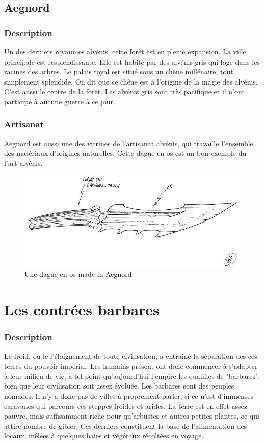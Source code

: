 \subsection{Aegnord}
\subsubsection{Description}
\hypertarget{aegnord}{}Un des derniers royaumes alvénis, cette forêt est en pleine expansion.
La ville principale est resplendissante.
Elle est habité par des alvénis gris qui loge dans les racines des arbres.
Le palais royal est situé sous un chêne millénaire, tout simplement splendide.
On dit que ce chêne est à l'origine de la magie des alvénis. C'est aussi le centre de la forêt.
Les alvénis gris sont très pacifique et il n'ont participé à aucune guerre à ce jour. 
\subsubsection{Artisanat}
Aegnord est aussi une des vitrines de l'artisanat alvénis, qui travaille l'ensemble des matériaux d'origines naturelles. Cette dague en os est un bon exemple du l'art alvénis.
\begin{figure}[ht]
\begin{center}
\includegraphics[scale=0.4]{./Ressources/medieval/dague_1.jpg}
\caption{Une dague en os made in Aegnord}
\end{center}
\end{figure}
\section{Les contrées barbares}
\subsubsection{Description}
\hypertarget {lescontreesbarbares}{}
Le froid, ou le l'éloignement de toute civilisation, a entrainé la séparation des ces terres du pouvoir impérial. Les humains présent ont donc commencer à s'adapter à leur milieu de vie, à tel point qu'aujourd'hui l'empire les qualifies de "barbares", bien que leur civilisation soit assez évoluée.
Les barbares sont des peuples nomades. Il n'y a donc pas de villes à proprement parler, si ce n'est d'immenses caravanes qui parcours ces steppes froides et arides.
La terre est en effet assez pauvre, mais suffisamment riche pour qu'arbustes et autres  petites plantes, ce qui attire nombre de gibier. Ces derniers constituent la base de l'alimentation des locaux, mêlées à quelques baies et végétaux récoltées en voyage.
